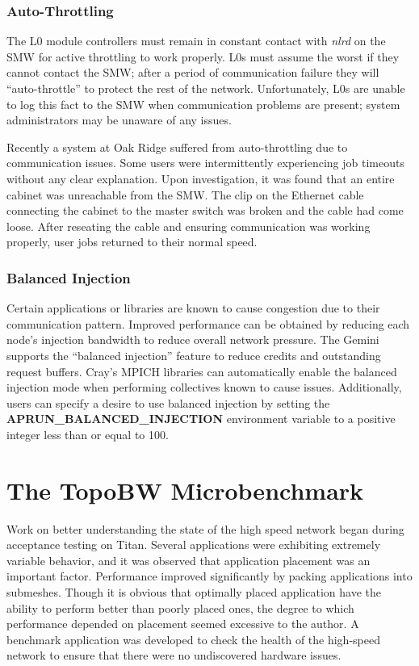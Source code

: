 \documentclass[10pt, conference, compsocconf]{IEEEtran}
\begin{document}
\subsubsection{Auto-Throttling}

The L0 module controllers must remain in constant contact with \emph{nlrd} on
the SMW for active throttling to work properly.  L0s must assume the worst if
they cannot contact the SMW; after a period of communication failure they will
``auto-throttle'' to protect the rest of the network.  Unfortunately, L0s are
unable to log this fact to the SMW when communication problems are present;
system administrators may be unaware of any issues.

Recently a system at Oak Ridge suffered from auto-throttling due to
communication issues.  Some users were intermittently experiencing job timeouts
without any clear explanation.  Upon investigation, it was found that an entire
cabinet was unreachable from the SMW.  The clip on the Ethernet cable
connecting the cabinet to the master switch was broken and the cable had come
loose.  After reseating the cable and ensuring communication was working
properly, user jobs returned to their normal speed.

\subsubsection{Balanced Injection}

Certain applications or libraries are known to cause congestion due to their
communication pattern.  Improved performance can be obtained by reducing each
node's injection bandwidth to reduce overall network pressure.  The Gemini
supports the ``balanced injection'' feature to reduce credits and outstanding
request buffers.  Cray's MPICH libraries can automatically enable the balanced
injection mode when performing collectives known to cause issues.
Additionally, users can specify a desire to use balanced injection by setting
the \textbf{APRUN\_BALANCED\_INJECTION} environment variable to a positive
integer less than or equal to 100.

\section{The TopoBW Microbenchmark}

Work on better understanding the state of the high speed network began during
acceptance testing on Titan.  Several applications were exhibiting extremely
variable behavior, and it was observed that application placement was an
important factor.  Performance improved significantly by packing applications
into submeshes.  Though it is obvious that optimally placed application have
the ability to perform better than poorly placed ones, the degree to which
performance depended on placement seemed excessive to the author.  A benchmark
application was developed to check the health of the high-speed network to
ensure that there were no undiscovered hardware issues.
\end{document}
